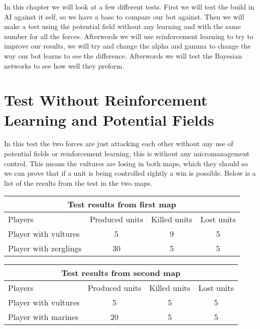 
In this chapter we will look at a few different tests.
First we will test the build in AI against it self, so we have a base to compare our bot against. Then we will make a test using the potential field without any learning and with the same number for all the forces. Afterwords we will use reinforcement learning to try to improve our results, we will try and change the alpha and gamma to change the way our bot learns to see the difference. Afterwords we will test the Bayesian networks to see how well they preform.

\section{Test Without Reinforcement Learning and Potential Fields} %
In this test the two forces are just attacking each other without any use of potential fields or reinforcement learning, this is without any micromanagement control. This means the vultures are losing in both maps, which they should so we can prove that if a unit is being controlled rightly a win is possible. Below is a list of the results from the test in the two maps.\\

\begin{centering}
 \begin{tabular}{|l|c|c|c|}
	\multicolumn{4}{c}{Test results from first map} \\
	\hline
		Players & Produced units & Killed units & Lost units\\
	\hline
	\hline
		Player with vultures & 5 & 9 & 5 \\
	\hline
		Player with zerglings & 30 & 5 & 5\\
	\hline

\end{tabular}
\end{centering}
\newpage

\begin{centering}
\begin{table}
 \begin{tabular}{|l|c|c|c|}
	\multicolumn{4}{c}{Test results from second map} \\
	\hline
	Players & Produced units & Killed units & Lost units\\
	\hline
		Player with vultures & 5 & 5 & 5\\
	\hline
		Player with marines & 20 & 5 & 5\\
	\hline

\end{tabular}
\end{table}
\end{centering}

